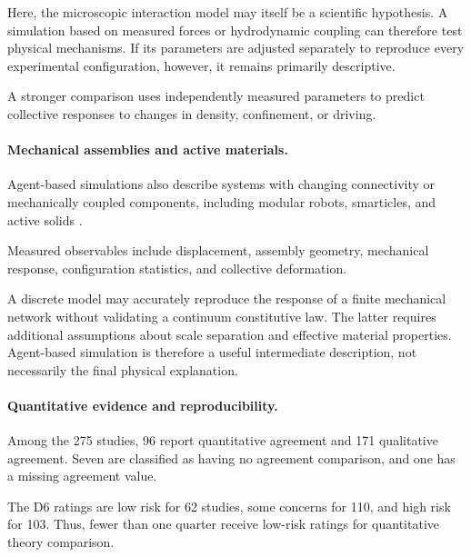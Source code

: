 Here, the microscopic interaction model
may itself be a scientific hypothesis.
A simulation based on measured forces
or hydrodynamic coupling can therefore
test physical mechanisms. If its
parameters are adjusted separately
to reproduce every experimental
configuration, however, it remains
primarily descriptive.

A stronger comparison uses independently
measured parameters to predict collective
responses to changes in density,
confinement, or driving.

\paragraph*{Mechanical assemblies and active materials.}

Agent-based simulations also describe
systems with changing connectivity
or mechanically coupled components,
including modular robots, smarticles,
and active solids
\cite{Vardhan2022glidersinshapecha,Savoie2019arobotmadeofrobo,Li2020programmingactiveg,Hu2026diatominspired1di,Rogowski2026coordinatedselfass,Kaeser2025individualandcolle,Bhattacharjee2026collectiveassembly,Li2019particleroboticsba,Baconnier2022tensioncontrolledc,Rezanejad2025programmableentangl,Brandenbourger2019nonreciprocalrobot,Brandenbourger2021limitcyclesturnac,Binysh2026moreislessinunpe,Coulais2025activemetamaterials,Chen2020selfsensingmetamat}.

Measured observables include displacement,
assembly geometry, mechanical response,
configuration statistics, and collective
deformation.

A discrete model may accurately reproduce
the response of a finite mechanical network
without validating a continuum constitutive
law. The latter requires additional
assumptions about scale separation
and effective material properties.
Agent-based simulation is therefore
a useful intermediate description,
not necessarily the final physical
explanation.

\paragraph*{Quantitative evidence and reproducibility.}

Among the 275 studies,
96 report quantitative agreement
and 171 qualitative agreement.
Seven are classified as having
no agreement comparison, and one
has a missing agreement value.

The D6 ratings are low risk
for 62 studies, some concerns
for 110, and high risk for 103.
Thus, fewer than one quarter
receive low-risk ratings for
quantitative theory comparison.

